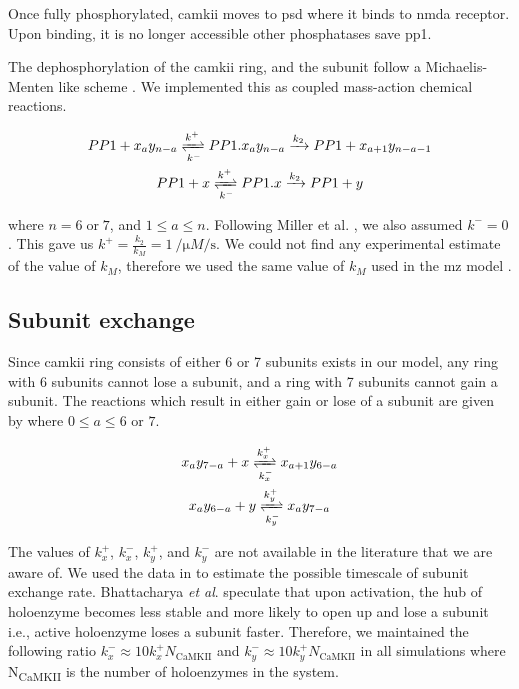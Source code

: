 \documentclass[9pt,lineno,doublespacing]{elife}
\newcommand\SUB[2]{#1\textsubscript{#2}}
\begin{document}
{Once fully phosphorylated, \gls{camkii} moves to \gls{psd} where it binds to
\gls{nmda} receptor. Upon binding, it is no longer accessible other phosphatases
save \gls{pp1}.

The dephosphorylation of the \gls{camkii} ring, and the subunit follow a
Michaelis-Menten like scheme . We implemented this 
as coupled mass-action chemical reactions.

\begin{equation}\label{eq:dephosphorylation} 
    \begin{gathered} 
        PP1 + x_ay_{n-a} \xrightleftharpoons[k^-]{k^+} PP1.x_ay_{n-a} 
            \xrightarrow{k_2} PP1 + x_{a+1}y_{n-a-1} \\ 
        PP1 + x \xrightleftharpoons[k^-]{k^+} PP1.x \xrightarrow{k_2} PP1 + y 
    \end{gathered}
\end{equation}

\noindent where $n=6\;\text{or}\;7$, and $1\le a \le n$. Following Miller et al.
\citep{miller_stability_2005}, we also assumed $k^-=0$. This gave us
$k^+=\frac{k_2}{k_M}=\SI{1}{\per\micro M\per\second}$. We could not find any
experimental estimate of the value of $k_M$, therefore we used the same value of $k_M$ 
used in the \gls{mz} model \citep{miller_stability_2005}.

\subsection{Subunit exchange}\label{subunit exchange} 

Since \gls{camkii} ring consists of either 6 or 7 subunits exists in our model,
any ring with 6 subunits cannot lose a subunit, and a ring with 7 subunits
cannot gain a subunit. The reactions which result in either gain or lose of a
subunit are given by  where $0\le a \le 6\text{ or }7$.

\begin{equation}\label{eq:losegainx}
    \begin{gathered}
    x_ay_{7-a} + x \xrightleftharpoons[k^-_x]{k^+_x} x_{a+1}y_{6-a} \\
    x_ay_{6-a} + y \xrightleftharpoons[k^-_y]{k^+_y} x_{a}y_{7-a}
    \end{gathered}
\end{equation}

The values of $k_x^+$, $k_x^-$, $k_y^+$, and $k_y^-$ are not available in the
literature that we are aware of. We used the data in
\citep{stratton_activation-triggered_2014} to estimate the possible timescale of
subunit exchange rate. Bhattacharya \textit{et al}.
\citep{bhattacharyya_molecular_2016} speculate that upon activation, the hub of
holoenzyme becomes less stable and more likely to open up and lose a subunit
i.e., active holoenzyme loses a subunit faster. Therefore, we maintained the
following ratio \(k_x^- \approx 10 k_x^+ N_{\text{CaMKII}}\) and \(k_y^- \approx
10 k_y^+ N_{\text{CaMKII}}\) in all simulations where \SUB{N}{CaMKII} is the
number of holoenzymes in the system.  

}
\end{document}
